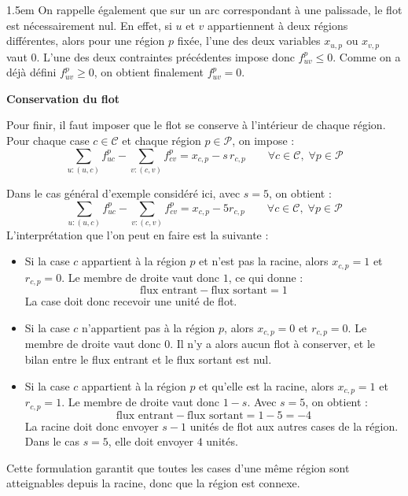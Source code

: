 \begin{adjustwidth}{1.5em}{}
On rappelle également que sur un arc correspondant à une palissade, le flot est nécessairement nul. En effet, si \(u\) et \(v\) appartiennent à deux régions différentes, alors pour une région \(p\) fixée, l'une des deux variables \(x_{u,p}\) ou \(x_{v,p}\) vaut \(0\). L'une des deux contraintes précédentes impose donc \(f^{p}_{uv} \leq 0\). Comme on a déjà défini \(f^{p}_{uv} \geq 0\), on obtient finalement \(f^{p}_{uv} = 0\).

\par
\noindent\textbf{Conservation du flot}
\par

Pour finir, il faut imposer que le flot se conserve à l'intérieur de chaque région. Pour chaque case \(c \in \mathcal{C}\) et chaque région \(p \in \mathcal{P}\), on impose :
\[
\sum_{u:(u,c)} f^{p}_{uc} - \sum_{v:(c,v)} f^{p}_{cv} = x_{c,p} - s\,r_{c,p}
\qquad \forall c \in \mathcal{C},\; \forall p \in \mathcal{P}
\]

Dans le cas général d'exemple considéré ici, avec \(s = 5\), on obtient :
\[
\sum_{u:(u,c)} f^{p}_{uc} - \sum_{v:(c,v)} f^{p}_{cv} = x_{c,p} - 5r_{c,p}
\qquad \forall c \in \mathcal{C},\; \forall p \in \mathcal{P}
\]
L'interprétation que l'on peut en faire est la suivante :

\begin{itemize}
    \item Si la case \(c\) appartient à la région \(p\) et n'est pas la racine, alors \(x_{c,p} = 1\) et \(r_{c,p} = 0\). Le membre de droite vaut donc \(1\), ce qui donne :
    \[
    \text{flux entrant} - \text{flux sortant} = 1
    \]
    La case doit donc recevoir une unité de flot.
    \item Si la case \(c\) n'appartient pas à la région \(p\), alors \(x_{c,p} = 0\) et \(r_{c,p} = 0\). Le membre de droite vaut donc \(0\). Il n'y a alors aucun flot à conserver, et le bilan entre le flux entrant et le flux sortant est nul.
    \item Si la case \(c\) appartient à la région \(p\) et qu'elle est la racine, alors \(x_{c,p} = 1\) et \(r_{c,p} = 1\). Le membre de droite vaut donc \(1-s\). Avec \(s=5\), on obtient :
    \[
    \text{flux entrant} - \text{flux sortant} = 1 - 5 = -4
    \]
    La racine doit donc envoyer \(s-1\) unités de flot aux autres cases de la région. Dans le cas \(s=5\), elle doit envoyer \(4\) unités.
\end{itemize}

Cette formulation garantit que toutes les cases d'une même région sont atteignables depuis la racine, donc que la région est connexe.

\end{adjustwidth}

